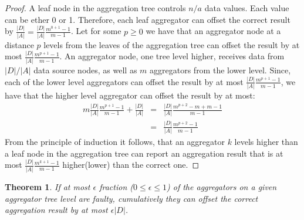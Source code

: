 \documentclass[11pt,twocolumn]{MyTightStyle}
\theoremstyle{plain}
\newtheorem{thm}{Theorem}
\theoremstyle{definition}
\theoremstyle{remark}
\numberwithin{equation}{section}
\begin{document}
\begin{proof}
A leaf node in the aggregation tree controls $n/a$ data values. Each
value can be ether 0 or 1. Therefore, each leaf aggregator can offset
the correct result by $\frac{|D|}{|A|} = \frac{|D|}{|A|}\frac{m^{0+1}-1}{m-1}$.
Let for some $p \geq 0$ we have that an aggregator node at a distance
$p$ levels from the leaves of the aggregation tree can offset the
result by at most $\frac{|D|}{|A|}\frac{m^{p+1}-1}{m-1}$. An aggregator
node, one tree level higher, receives data from $|D|/|A|$ data source
nodes, as well as $m$ aggregators from the lower level. Since, each of
the lower level aggregators can offset the result by at most
$\frac{|D|}{|A|}\frac{m^{p+1}-1}{m-1}$, we have that the higher level
aggregator can offset the result by at most:
\begin{eqnarray*}
m\frac{|D|}{|A|}\frac{m^{p+1}-1}{m-1} + \frac{|D|}{|A|} &=&
\frac{|D|}{|A|}\frac{m^{p+2}-m+m-1}{m-1}\\
&=& \frac{|D|}{|A|}\frac{m^{p+2}-1}{m-1}
\end{eqnarray*}
From the principle of induction it follows, that an aggregator $k$
levels higher than a leaf node in the aggregation tree can report an
aggregation result that is at most $\frac{|D|}{|A|}\frac{m^{k+1} -1}{m-1}$
higher(lower) than the correct one.
\end{proof}

\begin{thm} 
\label{thm:faulty}
If at most $\epsilon$ fraction ($0 \leq \epsilon \leq 1$)
  of the aggregators on a given aggregator tree level are faulty,
  cumulatively  they can offset the correct aggregation result by at
  most  $\epsilon |D|$.
\end{thm} 
\end{document}
